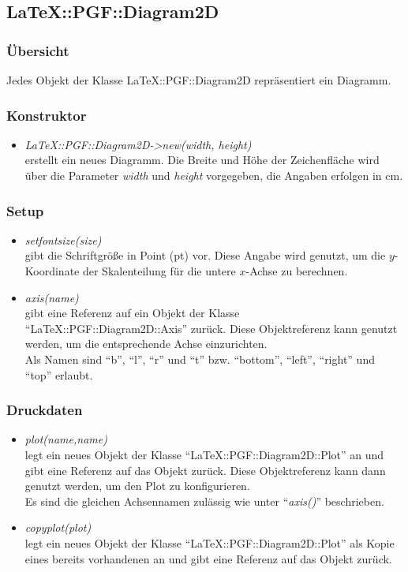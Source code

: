 \documentclass[ngerman,origlongtable]{scrartcl}
\begin{document}
\subsection[Diagram]{LaTeX::PGF::Diagram2D}
\subsubsection{Übersicht}
Jedes Objekt der Klasse LaTeX::PGF::Diagram2D repräsentiert ein Diagramm.
\subsubsection{Konstruktor}
\begin{itemize}
\item	\textit{LaTeX::PGF::Diagram2D-\textgreater{}new(width, height)\/}\\
erstellt ein neues Diagramm. Die Breite und Höhe der Zeichenfläche wird
über die Parameter \textit{width\/} und \textit{height\/} vorgegeben,
die Angaben erfolgen in cm.
\end{itemize}
\subsubsection{Setup}
\begin{itemize}
\item	\textit{set\textunderscore{}font\textunderscore{}size(size)\/}\\
gibt die Schriftgröße in Point (pt) vor. Diese Angabe wird genutzt,
um die \(y\)-Koordinate der Skalenteilung für die untere \(x\)-Achse
zu berechnen.
\item	\textit{axis(name)\/}\\
gibt eine Referenz auf ein Objekt der Klasse
"`LaTeX::PGF::Diagram2D::Axis"' zurück. Diese Objektreferenz kann genutzt
werden, um die entsprechende Achse einzurichten.\\
Als Namen sind "`b"', "`l"', "`r"' und "`t"' bzw. "`bottom"', "`left"',
"`right"' und "`top"' erlaubt.
\end{itemize}
\subsubsection{Druckdaten}
\begin{itemize}
\item	\textit{plot(name,name)\/}\\
legt ein neues Objekt der Klasse "`LaTeX::PGF::Diagram2D::Plot"' an und gibt eine
Referenz auf das Objekt zurück. Diese Objektreferenz kann dann genutzt
werden, um den Plot zu konfigurieren.\\
Es sind die gleichen Achsennamen zulässig wie unter "`\textit{axis()}"'
beschrieben.
\item	\textit{copy\textunderscore{}plot(plot)\/}\\
legt ein neues Objekt der Klasse "`LaTeX::PGF::Diagram2D::Plot"' als Kopie
eines bereits vorhandenen an und gibt eine Referenz auf das Objekt zurück.\\
\end{itemize}
\end{document}

